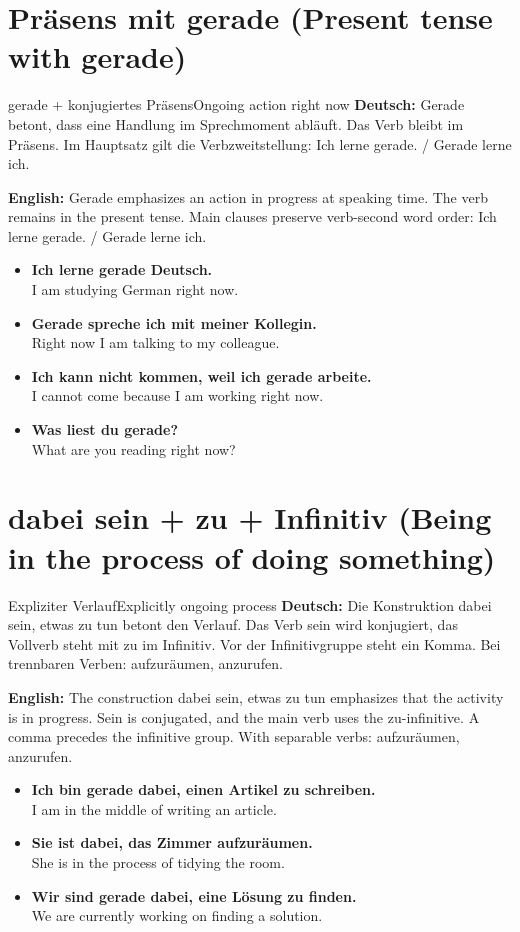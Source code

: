 \documentclass[a4paper,11pt]{article}
\newcommand{\GermanText}[1]{\textbf{Deutsch: }#1\par}
\newcommand{\EnglishText}[1]{{\small\color{SoftGray}\textbf{English: }#1\par}}
\newcommand{\ExampleItem}[2]{\item \textbf{#1}\\{\small\color{SoftGray}#2}}
\begin{document}
\section{Präsens mit gerade \textnormal{(Present tense with gerade)}}
\begin{grammarentry}{gerade + konjugiertes Präsens}{Ongoing action right now}
\GermanText{Gerade betont, dass eine Handlung im Sprechmoment abläuft. Das Verb bleibt im Präsens. Im Hauptsatz gilt die Verbzweitstellung: Ich lerne gerade. / Gerade lerne ich.}
\EnglishText{Gerade emphasizes an action in progress at speaking time. The verb remains in the present tense. Main clauses preserve verb-second word order: Ich lerne gerade. / Gerade lerne ich.}
\end{grammarentry}
\begin{exbox}
\begin{itemize}
\ExampleItem{Ich lerne gerade Deutsch.}{I am studying German right now.}
\ExampleItem{Gerade spreche ich mit meiner Kollegin.}{Right now I am talking to my colleague.}
\ExampleItem{Ich kann nicht kommen, weil ich gerade arbeite.}{I cannot come because I am working right now.}
\ExampleItem{Was liest du gerade?}{What are you reading right now?}
\end{itemize}
\end{exbox}

\section{dabei sein + zu + Infinitiv \textnormal{(Being in the process of doing something)}}
\begin{grammarentry}{Expliziter Verlauf}{Explicitly ongoing process}
\GermanText{Die Konstruktion dabei sein, etwas zu tun betont den Verlauf. Das Verb sein wird konjugiert, das Vollverb steht mit zu im Infinitiv. Vor der Infinitivgruppe steht ein Komma. Bei trennbaren Verben: aufzuräumen, anzurufen.}
\EnglishText{The construction dabei sein, etwas zu tun emphasizes that the activity is in progress. Sein is conjugated, and the main verb uses the zu-infinitive. A comma precedes the infinitive group. With separable verbs: aufzuräumen, anzurufen.}
\end{grammarentry}
\begin{exbox}
\begin{itemize}
\ExampleItem{Ich bin gerade dabei, einen Artikel zu schreiben.}{I am in the middle of writing an article.}
\ExampleItem{Sie ist dabei, das Zimmer aufzuräumen.}{She is in the process of tidying the room.}
\ExampleItem{Wir sind gerade dabei, eine Lösung zu finden.}{We are currently working on finding a solution.}
\end{itemize}
\end{exbox}
\end{document}
